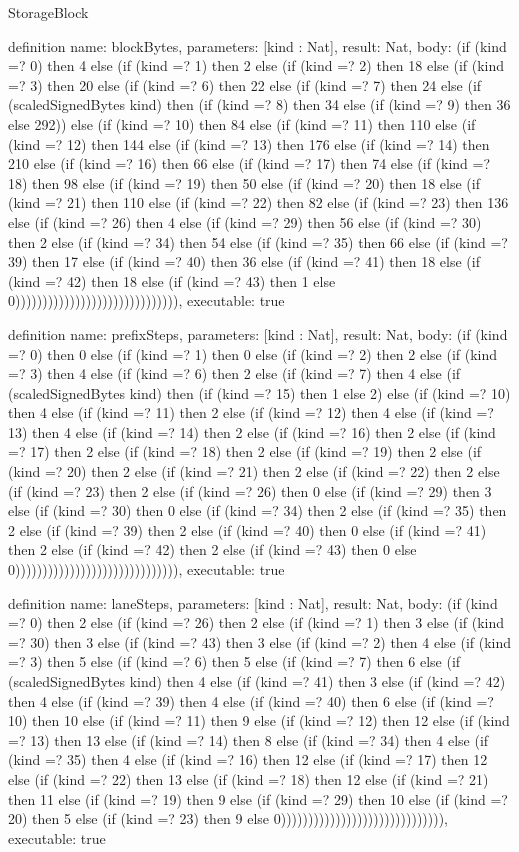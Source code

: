 \begin{lexlean}{StorageBlock}
\begin{semanticmodule}
definition{
  name: blockBytes,
  parameters: [kind : Nat],
  result: Nat,
  body: (if (kind =? 0) then 4 else (if (kind =? 1) then 2 else (if (kind =? 2) then 18 else (if (kind =? 3) then 20 else (if (kind =? 6) then 22 else (if (kind =? 7) then 24 else (if (scaledSignedBytes kind) then (if (kind =? 8) then 34 else (if (kind =? 9) then 36 else 292)) else (if (kind =? 10) then 84 else (if (kind =? 11) then 110 else (if (kind =? 12) then 144 else (if (kind =? 13) then 176 else (if (kind =? 14) then 210 else (if (kind =? 16) then 66 else (if (kind =? 17) then 74 else (if (kind =? 18) then 98 else (if (kind =? 19) then 50 else (if (kind =? 20) then 18 else (if (kind =? 21) then 110 else (if (kind =? 22) then 82 else (if (kind =? 23) then 136 else (if (kind =? 26) then 4 else (if (kind =? 29) then 56 else (if (kind =? 30) then 2 else (if (kind =? 34) then 54 else (if (kind =? 35) then 66 else (if (kind =? 39) then 17 else (if (kind =? 40) then 36 else (if (kind =? 41) then 18 else (if (kind =? 42) then 18 else (if (kind =? 43) then 1 else 0)))))))))))))))))))))))))))))),
  executable: true
}

definition{
  name: prefixSteps,
  parameters: [kind : Nat],
  result: Nat,
  body: (if (kind =? 0) then 0 else (if (kind =? 1) then 0 else (if (kind =? 2) then 2 else (if (kind =? 3) then 4 else (if (kind =? 6) then 2 else (if (kind =? 7) then 4 else (if (scaledSignedBytes kind) then (if (kind =? 15) then 1 else 2) else (if (kind =? 10) then 4 else (if (kind =? 11) then 2 else (if (kind =? 12) then 4 else (if (kind =? 13) then 4 else (if (kind =? 14) then 2 else (if (kind =? 16) then 2 else (if (kind =? 17) then 2 else (if (kind =? 18) then 2 else (if (kind =? 19) then 2 else (if (kind =? 20) then 2 else (if (kind =? 21) then 2 else (if (kind =? 22) then 2 else (if (kind =? 23) then 2 else (if (kind =? 26) then 0 else (if (kind =? 29) then 3 else (if (kind =? 30) then 0 else (if (kind =? 34) then 2 else (if (kind =? 35) then 2 else (if (kind =? 39) then 2 else (if (kind =? 40) then 0 else (if (kind =? 41) then 2 else (if (kind =? 42) then 2 else (if (kind =? 43) then 0 else 0)))))))))))))))))))))))))))))),
  executable: true
}

definition{
  name: laneSteps,
  parameters: [kind : Nat],
  result: Nat,
  body: (if (kind =? 0) then 2 else (if (kind =? 26) then 2 else (if (kind =? 1) then 3 else (if (kind =? 30) then 3 else (if (kind =? 43) then 3 else (if (kind =? 2) then 4 else (if (kind =? 3) then 5 else (if (kind =? 6) then 5 else (if (kind =? 7) then 6 else (if (scaledSignedBytes kind) then 4 else (if (kind =? 41) then 3 else (if (kind =? 42) then 4 else (if (kind =? 39) then 4 else (if (kind =? 40) then 6 else (if (kind =? 10) then 10 else (if (kind =? 11) then 9 else (if (kind =? 12) then 12 else (if (kind =? 13) then 13 else (if (kind =? 14) then 8 else (if (kind =? 34) then 4 else (if (kind =? 35) then 4 else (if (kind =? 16) then 12 else (if (kind =? 17) then 12 else (if (kind =? 22) then 13 else (if (kind =? 18) then 12 else (if (kind =? 21) then 11 else (if (kind =? 19) then 9 else (if (kind =? 29) then 10 else (if (kind =? 20) then 5 else (if (kind =? 23) then 9 else 0)))))))))))))))))))))))))))))),
  executable: true
}


\end{semanticmodule}
\end{lexlean}

